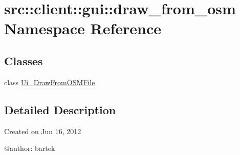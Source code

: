 \hypertarget{namespacesrc_1_1client_1_1gui_1_1draw__from__osm}{
\section{src::client::gui::draw\_\-from\_\-osm Namespace Reference}
\label{namespacesrc_1_1client_1_1gui_1_1draw__from__osm}
}
\subsection*{Classes}
\begin{DoxyCompactItemize}
\item 
class \hyperlink{classsrc_1_1client_1_1gui_1_1draw__from__osm_1_1Ui__DrawFromOSMFile}{Ui\_\-DrawFromOSMFile}
\end{DoxyCompactItemize}


\subsection{Detailed Description}
\begin{DoxyVerb}
Created on Jun 16, 2012

@author: bartek
\end{DoxyVerb}
 